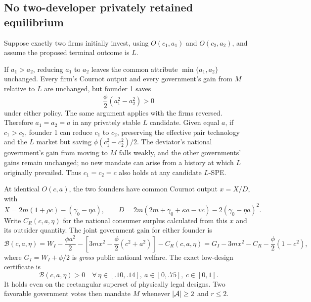 \subsection{No two-developer privately retained equilibrium}\label{app:two-investors}

Suppose exactly two firms initially invest, using \(O(c_1,a_1)\) and \(O(c_2,a_2)\), and assume the proposed terminal outcome is \(L\).

If \(a_1>a_2\), reducing \(a_1\) to \(a_2\) leaves the common attribute \(\min\{a_1,a_2\}\) unchanged. Every firm's Cournot output and every government's gain from \(M\) relative to \(L\) are unchanged, but founder 1 saves
\[
 \frac{\phi}{2}(a_1^2-a_2^2)>0
\]
under either policy. The same argument applies with the firms reversed. Therefore \(a_1=a_2=a\) in any privately stable \(L\) candidate. Given equal \(a\), if \(c_1>c_2\), founder 1 can reduce \(c_1\) to \(c_2\), preserving the effective pair technology and the \(L\) market but saving \(\phi(c_1^2-c_2^2)/2\). The deviator's national government's gain from moving to \(M\) falls weakly, and the other governments' gains remain unchanged; no new mandate can arise from a history at which \(L\) originally prevailed. Thus \(c_1=c_2=c\) also holds at any candidate \(L\)-SPE.

At identical \(O(c,a)\), the two founders have common Cournot output \(x=X/D\), with
\[
 X=2m(1+\rho c)-(\gamma_0-\eta a),\qquad
 D=2m(2m+\gamma_0+\kappa a-vc)-2(\gamma_0-\eta a)^2.
\]
Write \(C_R(c,a,\eta)\) for the national consumer surplus calculated from this \(x\) and its outsider quantity. The joint government gain for either founder is
\[
 \mathcal B(c,a,\eta)
 =W_I-\frac{\phi a^2}{2}
   -\left[3mx^2-\frac{\phi}{2}(c^2+a^2)\right]
   -C_R(c,a,\eta)
 =G_I-3mx^2-C_R-\frac{\phi}{2}(1-c^2),
\]
where \(G_I=W_I+\phi/2\) is \emph{gross} public national welfare. The exact low-design certificate is
\begin{equation}
 \mathcal B(c,a,\eta)>0
 \quad \forall\,\eta\in[.10,.14],\
 a\in[0,.75],\ c\in[0,1].
 \label{eq:app-low-a}
\end{equation}
It holds even on the rectangular superset of physically legal designs. Two favorable government votes then mandate \(M\) whenever \(|\mathcal{A}|\ge2\) and \(r\le2\).

